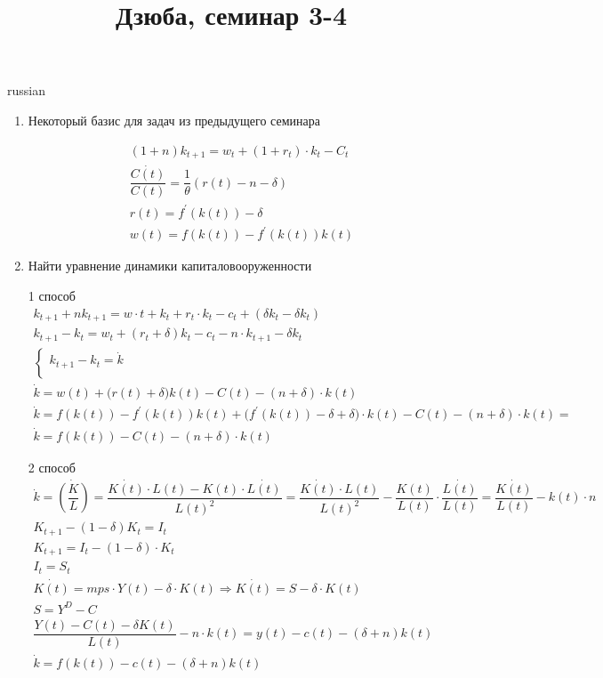 \documentclass{article}
\begin{document}
\title{\foreignlanguage{russian}{Дзюба, семинар 3-4}}
\maketitle
\begin{otherlanguage*}{russian}

\begin{enumerate}
\item Некоторый базис для задач из предыдущего семинара 

\begin{align}
(1 + n ) k_{t + 1} = w_t + (1 + r_t) \cdot k_t - C_t \\
\dfrac{\dot{C(t)}}{C(t)} = \dfrac{1}{\theta} ( r(t) - n - \delta ) \\
r(t) = f^{'} (k(t)) - \delta \\ 
w(t)= f (k(t)) - f ^{'} (k(t)) k(t) 
\end{align} 

\item Найти уравнение динамики капиталовооруженности

1 способ
\begin{align*}
k_{t+1} + n k_{t+1} = w \cdot t + k_{t} + r_t \cdot k_t - c_t + (\delta k_t - \delta k_t) \\
k_{t+1} - k_t = w_t + (r_t + \delta) k_t - c_t - n \cdot k_{t+1} - \delta k_t \\
\begin{cases}
k_{t+1} - k_t = \dot{k} \\
\end{cases} \\
\dot{k} = w(t) + \Big( r(t) + \delta \Big) k(t) - C(t) - (n + \delta) \cdot k(t) \\ 
\dot{k} = f (k(t)) - f ^{'} (k(t)) k(t) + \Big(  f^{'} (k(t)) - \delta + \delta \Big) \cdot k(t) - C(t) -  (n + \delta) \cdot k(t) = \\
\dot{k} = f (k(t)) - C(t) - (n + \delta) \cdot k(t) 
\end{align*}

2 способ 
\begin{align*}
\dot{k} = \dot{(\dfrac{K}{L})} = \dfrac{\dot{K(t)} \cdot L(t) - K(t) \cdot \dot{L(t)}}{L(t)^2} = \dfrac{\dot{K(t)} \cdot L(t)}{L(t)  ^ 2} - \dfrac{K(t)}{L(t)} \cdot \dfrac{\dot{L(t)}}{L(t)} = \dfrac{\dot{K(t)}}{L(t)} - k(t) \cdot n \\
K_{t+1} - (1 - \delta) K_t = I_t \\
K_{t+1} = I_t - (1 - \delta) \cdot K_t \\
I_t = S_{t} \\
\dot{K(t)} = mps \cdot Y(t) - \delta \cdot K(t) \Rightarrow \dot{K(t)} = S - \delta \cdot K(t) \\
S = Y^D - C \\
\dfrac{Y(t) - C(t) - \delta K(t)}{L(t)} - n \cdot k(t) = y(t) - c(t)  - (\delta + n) k(t) \\
\dot{k} = f(k(t)) - c(t) - (\delta + n) k(t) 
\end{align*}


\end{enumerate}
\end{otherlanguage*}
\end{document}
